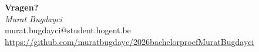 \documentclass[aspectratio=169]{beamer}
\begin{document}
\begin{frame}
  \begin{center}
    \vspace{1em}
    {\Huge \textbf{Vragen?}} \\[1.5em]
    \textit{Murat Bugdayci} \\[0.3em]
    murat.bugdayci@student.hogent.be \\[0.5em]
    \small\url{https://github.com/muratbugdayc/2026bachelorproefMuratBugdayci}
  \end{center}
\end{frame}
\end{document}
